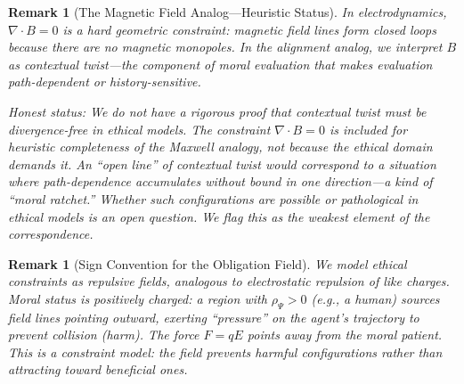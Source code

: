 \documentclass[12pt]{article}
\newtheorem{remark}[theorem]{Remark}
\begin{document}
\begin{remark}[The Magnetic Field Analog---Heuristic Status]
\label{rem:magnetic}
\emph{In electrodynamics, $\nabla \cdot B = 0$ is a
hard geometric constraint: magnetic field lines form closed loops because there are no magnetic
monopoles. In the alignment analog, we interpret $B$ as contextual twist---the component of moral
evaluation that makes evaluation path-dependent or history-sensitive.}

\emph{Honest status: We do not have a rigorous proof that contextual twist must be divergence-free
in ethical models. The constraint $\nabla \cdot B = 0$ is included for heuristic completeness of the Maxwell
analogy, not because the ethical domain demands it. An ``open line'' of contextual twist would
correspond to a situation where path-dependence accumulates without bound in one direction---a
kind of ``moral ratchet.'' Whether such configurations are possible or pathological in ethical models
is an open question. We flag this as the weakest element of the correspondence.}
\end{remark}

\begin{remark}[Sign Convention for the Obligation Field]
\emph{We model ethical constraints as repulsive
fields, analogous to electrostatic repulsion of like charges. Moral status is positively charged:
a region with $\rho_\Psi > 0$ (e.g., a human) sources field lines pointing outward, exerting ``pressure'' on
the agent's trajectory to prevent collision (harm). The force $F = qE$ points away from the moral
patient. This is a constraint model: the field prevents harmful configurations rather than attracting
toward beneficial ones.}
\end{remark}
\end{document}
